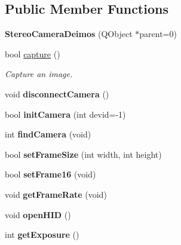 \subsection*{Public Member Functions}
\begin{DoxyCompactItemize}
\item 
\hypertarget{class_stereo_camera_deimos_ae69499b39216ee6b6aa5b2e9512f3c09}{}{\bfseries Stereo\+Camera\+Deimos} (Q\+Object $\ast$parent=0)\label{class_stereo_camera_deimos_ae69499b39216ee6b6aa5b2e9512f3c09}

\item 
bool \hyperlink{class_stereo_camera_deimos_a7526953f7562acc07841ebd6a49dc043}{capture} ()
\begin{DoxyCompactList}\small\item\em Capture an image. \end{DoxyCompactList}\item 
\hypertarget{class_stereo_camera_deimos_a60c865353deac27471bbdc0316099c1b}{}void {\bfseries disconnect\+Camera} ()\label{class_stereo_camera_deimos_a60c865353deac27471bbdc0316099c1b}

\item 
\hypertarget{class_stereo_camera_deimos_a3af4df4317df52f1900f9372d9cbf8bd}{}bool {\bfseries init\+Camera} (int devid=-\/1)\label{class_stereo_camera_deimos_a3af4df4317df52f1900f9372d9cbf8bd}

\item 
\hypertarget{class_stereo_camera_deimos_a64982ba0f3de8f93e3e179f5575496e0}{}int {\bfseries find\+Camera} (void)\label{class_stereo_camera_deimos_a64982ba0f3de8f93e3e179f5575496e0}

\item 
\hypertarget{class_stereo_camera_deimos_a7b6f5773ef6266aa79b5970210e00d71}{}bool {\bfseries set\+Frame\+Size} (int width, int height)\label{class_stereo_camera_deimos_a7b6f5773ef6266aa79b5970210e00d71}

\item 
\hypertarget{class_stereo_camera_deimos_a538f481037c273608cfee38bb714a9f0}{}bool {\bfseries set\+Frame16} (void)\label{class_stereo_camera_deimos_a538f481037c273608cfee38bb714a9f0}

\item 
\hypertarget{class_stereo_camera_deimos_ac734aa162a5994522b5ec4078e6d4d4f}{}void {\bfseries get\+Frame\+Rate} (void)\label{class_stereo_camera_deimos_ac734aa162a5994522b5ec4078e6d4d4f}

\item 
\hypertarget{class_stereo_camera_deimos_a9e40d1909c6552c982b06ed73eb737ba}{}void {\bfseries open\+H\+I\+D} ()\label{class_stereo_camera_deimos_a9e40d1909c6552c982b06ed73eb737ba}

\item 
\hypertarget{class_stereo_camera_deimos_a19578fe34c606f6d40f561b56bc3aad8}{}int {\bfseries get\+Exposure} ()\label{class_stereo_camera_deimos_a19578fe34c606f6d40f561b56bc3aad8}

\end{DoxyCompactItemize}
